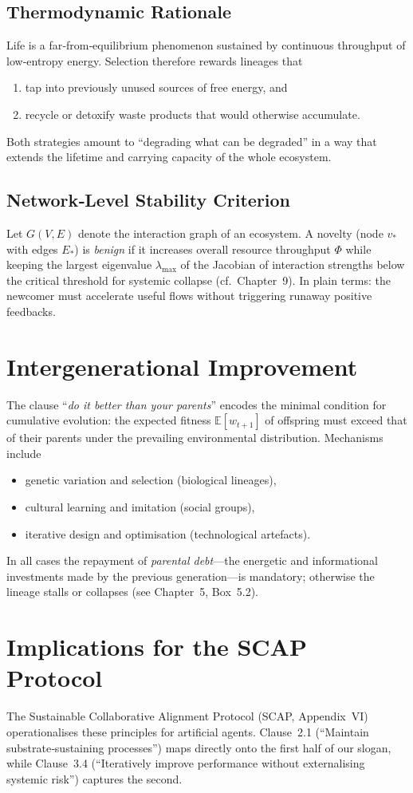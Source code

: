 \subsection*{Thermodynamic Rationale}
Life is a far‑from‑equilibrium phenomenon sustained by continuous throughput of low‑entropy energy.  Selection therefore rewards lineages that 
\begin{enumerate}
  \item tap into previously unused sources of free energy, and
  \item recycle or detoxify waste products that would otherwise accumulate.  
\end{enumerate}
Both strategies amount to “degrading what can be degraded” in a way that extends the lifetime and carrying capacity of the whole ecosystem.

\subsection*{Network‑Level Stability Criterion}
Let $G(V,E)$ denote the interaction graph of an ecosystem.  A novelty (node $v_*$ with edges $E_*$) is \emph{benign} if it increases overall resource throughput $\Phi$ while keeping the largest eigenvalue $\lambda_{\max}$ of the Jacobian of interaction strengths below the critical threshold for systemic collapse (cf.~Chapter~9).  In plain terms: the newcomer must accelerate useful flows without triggering runaway positive feedbacks.

\section*{Intergenerational Improvement}
The clause “\emph{do it better than your parents}” encodes the minimal condition for cumulative evolution: the expected fitness $\mathbb{E}[w_{t+1}]$ of offspring must exceed that of their parents under the prevailing environmental distribution.  Mechanisms include
\begin{itemize}
  \item genetic variation and selection (biological lineages),
  \item cultural learning and imitation (social groups),
  \item iterative design and optimisation (technological artefacts).
\end{itemize}
In all cases the repayment of \emph{parental debt}---the energetic and informational investments made by the previous generation---is mandatory; otherwise the lineage stalls or collapses (see Chapter~5, Box~5.2).

\section*{Implications for the SCAP Protocol}
The Sustainable Collaborative Alignment Protocol (SCAP, Appendix VI) operationalises these principles for artificial agents.  Clause~2.1 (“Maintain substrate‑sustaining processes”) maps directly onto the first half of our slogan, while Clause~3.4 (“Iteratively improve performance without externalising systemic risk”) captures the second.



